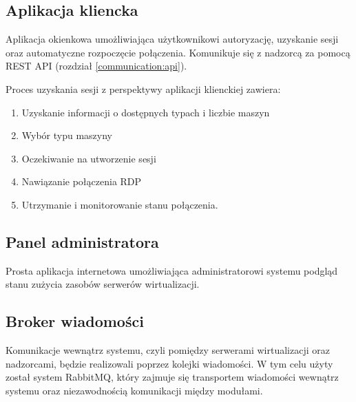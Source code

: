 \documentclass[../opis-rozwiazania.tex]{subfiles}
\begin{document}
\subsection{Aplikacja kliencka}
\label{modules:client}

Aplikacja okienkowa umożliwiająca użytkownikowi autoryzację, uzyskanie sesji oraz automatyczne rozpoczęcie połączenia. Komunikuje się z nadzorcą za pomocą REST API (rozdział \ref{communication:api}).

Proces uzyskania sesji z perspektywy aplikacji klienckiej zawiera:
\begin{enumerate}
    \item Uzyskanie informacji o dostępnych typach i liczbie maszyn
    \item Wybór typu maszyny
    \item Oczekiwanie na utworzenie sesji
    \item Nawiązanie połączenia RDP
    \item Utrzymanie i monitorowanie stanu połączenia.
\end{enumerate}

\subsection{Panel administratora}

Prosta aplikacja internetowa umożliwiająca administratorowi systemu podgląd stanu zużycia zasobów serwerów wirtualizacji.

\subsection{Broker wiadomości}
\label{modules:broker}

Komunikacje wewnątrz systemu, czyli pomiędzy serwerami wirtualizacji oraz nadzorcami, będzie realizowali poprzez kolejki wiadomości. W tym celu użyty został system RabbitMQ, który zajmuje się transportem wiadomości wewnątrz systemu oraz niezawodnością komunikacji między modułami.
\end{document}
